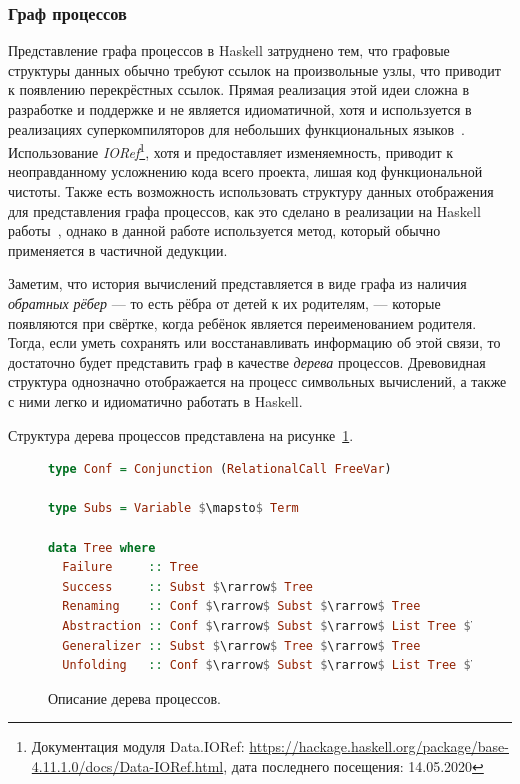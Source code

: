 \subsubsection{Граф процессов}

Представление графа процессов в Haskell затруднено тем, что графовые
структуры данных обычно требуют ссылок на произвольные узлы,
что приводит к появлению перекрёстных ссылок. Прямая реализация этой
идеи сложна в разработке и поддержке и не является идиоматичной, хотя и используется
в реализациях суперкомпиляторов для небольших функциональных языков~\cite{scmini}.
Использование \emph{IORef}\footnote{Документация модуля Data.IORef: \url{https://hackage.haskell.org/package/base-4.11.1.0/docs/Data-IORef.html}, дата последнего посещения: 14.05.2020},
хотя и предоставляет изменяемность, приводит к неоправданному усложнению кода всего
проекта, лишая код функциональной чистоты. Также есть возможность использовать
структуру данных отображения для представления графа процессов, как это сделано
в реализации на Haskell работы~\cite{simplesc}, однако в данной работе используется
метод, который обычно применяется в частичной дедукции.

Заметим, что история вычислений представляется в виде графа из наличия
\emph{обратных рёбер}
--- то есть рёбра от детей к их родителям, --- которые появляются при свёртке,
когда ребёнок является переименованием родителя.
Тогда, если уметь сохранять или восстанавливать информацию об этой связи, то
достаточно будет представить граф в качестве \emph{дерева} процессов.
Древовидная структура однозначно отображается на процесс символьных вычислений,
а также с ними легко и идиоматично работать в Haskell.

Структура дерева процессов представлена на рисунке~\ref{fig:ptree}.

\begin{figure}[h!]
\begin{lstlisting}[mathescape,language=Haskell,extendedchars=\true,frame=single,basicstyle=\ttfamily]
type Conf = Conjunction (RelationalCall FreeVar)

type Subs = Variable $\mapsto$ Term

data Tree where
  Failure     :: Tree
  Success     :: Subst $\rarrow$ Tree
  Renaming    :: Conf $\rarrow$ Subst $\rarrow$ Tree
  Abstraction :: Conf $\rarrow$ Subst $\rarrow$ List Tree $\rarrow$ Tree
  Generalizer :: Subst $\rarrow$ Tree $\rarrow$ Tree
  Unfolding   :: Conf $\rarrow$ Subst $\rarrow$ List Tree $\rarrow$ Tree
\end{lstlisting}
\caption{Описание дерева процессов.}
\label{fig:ptree}
\end{figure}

